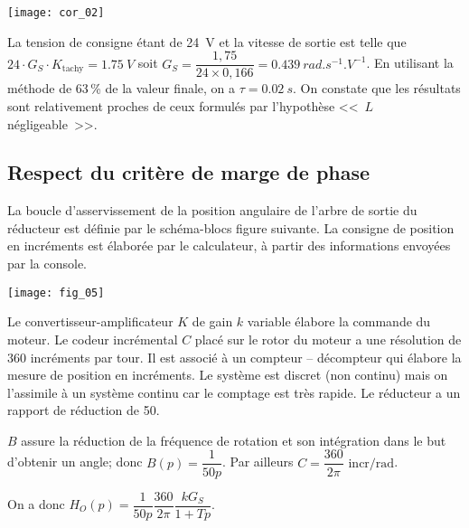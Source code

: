 \ifprof

\begin{marginfigure}
\texttt{[image: cor\_02]}
\end{marginfigure}

\begin{corrige}
La tension de consigne étant de \SI{24}{V} et la vitesse de sortie est telle que  $24\cdot G_S \cdot K_{\text{tachy}}= \SI{1,75}{V}$ soit $G_S = \dfrac{1,75}{24\times 0,166} = \SI{0,439}{rad.s^{-1}.V^{-1}} $. En utilisant la méthode de 63\,\% de la valeur finale, on a $\tau = \SI{0,02}{s}$.
On constate que les résultats sont relativement proches de ceux formulés par l'hypothèse <<~$L$ négligeable~>>.
\end{corrige}

\else
\fi

\subsection*{Respect du critère de marge de phase}
\ifprof
\else
La boucle d’asservissement de la position angulaire de l’arbre de sortie du réducteur est définie par le schéma-blocs figure suivante. 
La consigne de position en incréments est élaborée par le  calculateur, à partir des informations envoyées par la console.

\begin{center}
\texttt{[image: fig\_05]}
\end{center}


Le convertisseur-amplificateur $K$ de gain $k$ variable élabore la commande du moteur.
Le codeur incrémental $C$ placé sur le rotor du moteur a une résolution de 360 incréments par tour. Il est associé à un compteur -- décompteur qui élabore la mesure de position en incréments. 
Le système est discret (non continu) mais on l’assimile à un système continu car le comptage est très rapide. 
Le réducteur a un rapport de réduction de 50.
 
 \fi
 
\ifprof
\begin{corrige}
$B$ assure la réduction de la fréquence de rotation et son intégration dans le but d'obtenir un angle; donc $B(p)=\dfrac{1}{50p}$.
Par ailleurs $C=\dfrac{360}{2\pi}\text{ incr/rad} $. 

On a donc $H_O(p)=\dfrac{1}{50p}\dfrac{360}{2\pi} \dfrac{kG_S}{1+Tp}$.
\end{corrige}
\else
\fi


